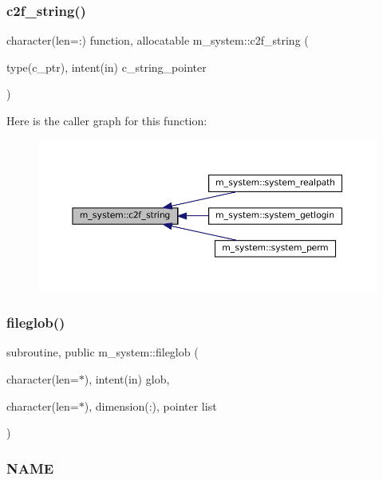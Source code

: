 \subsubsection{\texorpdfstring{c2f\+\_\+string()}{c2f\_string()}}
{\footnotesize\ttfamily character(len=\+:) function, allocatable m\+\_\+system\+::c2f\+\_\+string (\begin{DoxyParamCaption}\item[{type(c\+\_\+ptr), intent(in)}]{c\+\_\+string\+\_\+pointer }\end{DoxyParamCaption})\hspace{0.3cm}{\ttfamily [private]}}

Here is the caller graph for this function\+:\nopagebreak
\begin{figure}[H]
\begin{center}
\leavevmode
\includegraphics[width=350pt]{namespacem__system_aa7c5445619aa15cd2301fe17f7c3b73c_icgraph}
\end{center}
\end{figure}
\mbox{\label{namespacem__system_a79656f76ad75168302e0d770052e901e}} 
\subsubsection{\texorpdfstring{fileglob()}{fileglob()}}
{\footnotesize\ttfamily subroutine, public m\+\_\+system\+::fileglob (\begin{DoxyParamCaption}\item[{character(len=$\ast$), intent(in)}]{glob,  }\item[{character(len=$\ast$), dimension(\+:), pointer}]{list }\end{DoxyParamCaption})}



\subsubsection*{N\+A\+ME}

